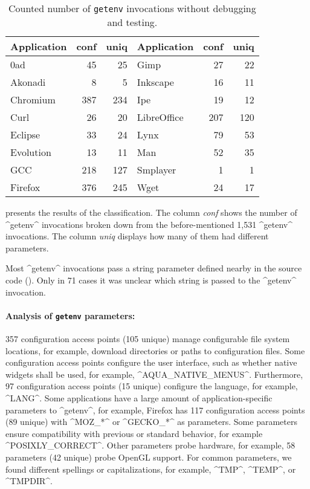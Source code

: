 \begin{table}[htp]
\begin{tabularx}{\columnwidth}{l  R  R | l R  R}
\toprule
{\bfseries Application} &
{\bfseries conf} &
{\bfseries uniq} &
{\bfseries Application} &
{\bfseries conf} &
{\bfseries uniq}
\\
\hline

0ad 		&    45  &    25   &Gimp 		&    27  &    22   \\
Akonadi 	&    8   &    5    &Inkscape	&    16  &    11   \\
Chromium 	&    387 &    234  &Ipe 		&    19  &    12   \\
Curl 		&    26  &    20   &LibreOffice 	&    207 &    120  \\
Eclipse 	&    33  &    24   &Lynx 		&    79  &    53   \\
Evolution 	&    13  &    11   &Man 		&    52  &    35   \\
GCC 		&    218 &    127  &Smplayer	&    1   &    1    \\
Firefox 	&    376 &    245  &Wget 		&    24  &    17   \\

\hline
\bottomrule

\end{tabularx}
\caption{Counted number of \texttt{getenv} invocations without debugging and testing.}
\label{tab:countconf}
\end{table}

\methodSource{}
 presents the results of the classification.
The column \emph{conf} shows the number of ^getenv^ invocations broken down from the before-mentioned 1,531 ^getenv^ invocations.
The column \emph{uniq} displays how many of them had different parameters.

Most ^getenv^ invocations pass a string parameter defined nearby in the source code ().
Only in 71 cases it was unclear which string is passed to the ^getenv^ invocation.

\paragraph{Analysis of \texttt{getenv} parameters:} 357 configuration access points (105 unique) manage configurable file system locations, for example, download directories or paths to configuration files. %
Some configuration access points configure the user interface, such as whether native widgets shall be used, for example, ^AQUA_NATIVE_MENUS^.
Furthermore, 97 configuration access points (15 unique) configure the language, for example, ^LANG^. %
Some applications have a large amount of application-specific parameters to ^getenv^, for example, Firefox has 117 configuration access points (89 unique) with ^MOZ_*^ or ^GECKO_*^ as parameters. %
Some parameters ensure compatibility with previous or standard behavior, for example ^POSIXLY_CORRECT^.
Other parameters probe hardware, for example, 58 parameters (42 unique) probe OpenGL support.
For common parameters, we found different spellings or capitalizations, for example, ^TMP^, ^TEMP^, or ^TMPDIR^.

